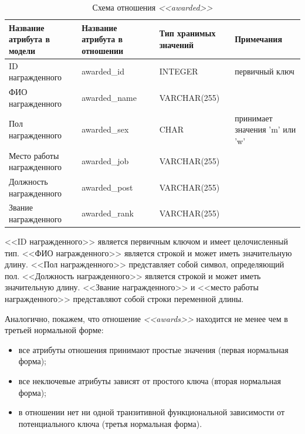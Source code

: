 \begin{table}[h!]


  \caption{Схема отношения \textit{<<awarded>>}}
  \label{tbl:awarded_scheme}
  \small{
    \centering
    \begin{tabular}{| p{} | p{} | p{} | p{} |}
      \hline
      Название атрибута \newline в модели &
      Название атрибута \newline в отношении &
      Тип хранимых \newline значений &
      Примечания \\ \hline

      ID награжденного &
      awarded\_id &
      INTEGER &
      первичный ключ \\
      \hline

      ФИО награжденного &
      awarded\_name &
      VARCHAR(255) & \\
      \hline

      Пол награжденного &
      awarded\_sex &
      CHAR &
      принимает значения 'm' или 'w' \\
      \hline

      Место работы \newline награжденного &
      awarded\_job &
      VARCHAR(255) & \\
      \hline

      Должность \newline награжденного &
      awarded\_post &
      VARCHAR(255) & \\
      \hline

      Звание \newline награжденного &
      awarded\_rank &
      VARCHAR(255) & \\
      \hline

    \end{tabular}
  }
\end{table}

<<ID награжденного>> является первичным ключом и имеет целочисленный тип.
<<ФИО награжденного>> является строкой и может иметь значительную длину.
<<Пол награжденного>> представляет собой символ, определяющий пол.
<<Должность награжденного>> является строкой и может иметь значительную длину.
<<Звание награжденного>> и <<место работы награжденного>> представляют собой строки переменной длины.

Аналогично, покажем, что отношение \textit{<<awards>>} находится не менее чем в третьей нормальной форме:
\begin{itemize}
\item
  все атрибуты отношения принимают простые значения (первая нормальная форма);
\item
  все неключевые атрибуты зависят от простого ключа
  (вторая нормальная форма); 
\item
  в отношении нет ни одной транзитивной функциональной зависимости от потенциального ключа
(третья нормальная форма).
\end{itemize}


